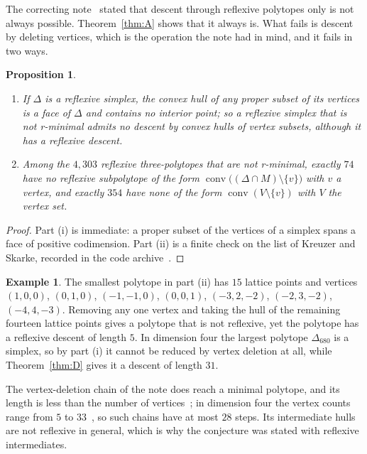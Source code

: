\documentclass[manuscript]{aomart}
\newtheorem{proposition}[theorem]{Proposition}
\theoremstyle{definition}
\newtheorem{example}[theorem]{Example}
\theoremstyle{remark}
\newcommand{\conv}{\operatorname{conv}}
\newcommand{\Dbig}{\Delta_{680}}
\newcommand{\DUB}{31}
\begin{document}
The correcting note~\cite{Bha26b} stated that descent through reflexive
polytopes only is not always possible. Theorem~\ref{thm:A} shows that it
always is. What fails is descent by deleting vertices, which is the
operation the note had in mind, and it fails in two ways.

\begin{proposition}\label{prop:vertexdeletion}
\begin{enumerate}[label=\textup{(\roman*)},leftmargin=*]
\item If $\Delta$ is a reflexive simplex, the convex hull of any proper
subset of its vertices is a face of $\Delta$ and contains no interior
point; so a reflexive simplex that is not r-minimal admits no descent by
convex hulls of vertex subsets, although it has a reflexive descent.
\item Among the $4{,}303$ reflexive three-polytopes that are not
r-minimal, exactly $74$ have no reflexive subpolytope of the form
$\conv\bigl((\Delta\cap M)\setminus\{v\}\bigr)$ with $v$ a vertex, and
exactly $354$ have none of the form $\conv(V\setminus\{v\})$ with $V$ the
vertex set.
\end{enumerate}
\end{proposition}

\begin{proof}
Part (i) is immediate: a proper subset of the vertices of a simplex spans
a face of positive codimension. Part (ii) is a finite check on the list of
Kreuzer and Skarke, recorded in the code archive~\cite{Repo}.
\end{proof}

\begin{example}\label{ex:vertexdeletion}
The smallest polytope in part (ii) has $15$ lattice points and vertices
$(1,0,0)$, $(0,1,0)$, $(-1,-1,0)$, $(0,0,1)$, $(-3,2,-2)$, $(-2,3,-2)$,
$(-4,4,-3)$. Removing any one vertex and taking the hull of the remaining
fourteen lattice points gives a polytope that is not reflexive, yet the
polytope has a reflexive descent of length $5$. In dimension four the
largest polytope $\Dbig$ is a simplex, so by part (i) it cannot be reduced
by vertex deletion at all, while Theorem~\ref{thm:D} gives it a descent of
length $\DUB$.
\end{example}

The vertex-deletion chain of the note does reach a minimal polytope, and
its length is less than the number of vertices~\cite{Bha26b}; in dimension
four the vertex counts range from $5$ to $33$~\cite{KS00}, so such chains
have at most $28$ steps. Its intermediate hulls are not reflexive in
general, which is why the conjecture was stated with reflexive
intermediates.
\end{document}
